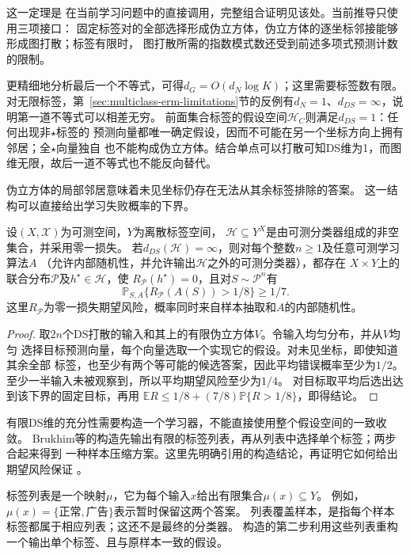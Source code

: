 这一定理是
在当前学习问题中的直接调用，完整组合证明见该处。当前推导只使用三项接口：
固定标签对的全部选择形成伪立方体，伪立方体的逐坐标邻接能够形成图打散；标签有限时，
图打散所需的指数模式数还受到前述多项式预测计数的限制。

更精细地分析最后一个不等式，可得$d_G=O(d_N\log K)$；这里需要标签数有限。
对无限标签，第~\ref{sec:multiclass-erm-limitations}节的反例有$d_N=1$、$d_{DS}=\infty$，说明第一道不等式可以相差无穷。
前面集合标签的假设空间$\mathcal H_C$则满足$d_{DS}=1$：任何出现非$\star$标签的
预测向量都唯一确定假设，因而不可能在另一个坐标方向上拥有邻居；全$\star$向量独自
也不能构成伪立方体。结合单点可以打散可知DS维为1，而图维无限，故后一道不等式也不能反向替代。

伪立方体的局部邻居意味着未见坐标仍存在无法从其余标签排除的答案。
这一结构可以直接给出学习失败概率的下界。

\begin{theorem}[无限DS维的不可学习性]
\label{thm:infinite-ds-lower-bound}
设$(X,\mathcal X)$为可测空间，$Y$为离散标签空间，
$\mathcal H\subseteq Y^X$是由可测分类器组成的非空集合，并采用零一损失。
若$d_{DS}(\mathcal H)=\infty$，则对每个整数$n\geq1$及任意可测学习算法$A$
（允许内部随机性，并允许输出$\mathcal H$之外的可测分类器），都存在
$X\times Y$上的联合分布$\mathcal P$及$h^\star\in\mathcal H$，使
$R_{\mathcal P}(h^\star)=0$，且对$S\sim\mathcal P^n$有
\[
 \mathbb P_{S,A}\{R_{\mathcal P}(A(S))>1/8\}\geq1/7.
\]
这里$R_{\mathcal P}$为零一损失期望风险，概率同时来自样本抽取和$A$的内部随机性。
\end{theorem}

\begin{proof}
取$2n$个DS打散的输入和其上的有限伪立方体$V$。令输入均匀分布，并从$V$均匀
选择目标预测向量，每个向量选取一个实现它的假设。对未见坐标，即使知道其余全部
标签，也至少有两个等可能的候选答案，因此平均错误概率至少为$1/2$。
至少一半输入未被观察到，所以平均期望风险至少为$1/4$。
对目标取平均后选出达到该下界的固定目标，再用
$\mathbb E R\leq1/8+(7/8)\mathbb P\{R>1/8\}$，即得结论。
\end{proof}

有限DS维的充分性需要构造一个学习器，不能直接使用整个假设空间的一致收敛。
Brukhim等的构造先输出有限的标签列表，再从列表中选择单个标签；两步合起来得到
一种样本压缩方案。这里先明确引用的构造结论，再证明它如何给出期望风险保证
。

标签列表是一个映射$\mu$，它为每个输入$x$给出有限集合$\mu(x)\subseteq Y$。
例如，$\mu(x)=\{\text{正常},\text{广告}\}$表示暂时保留这两个答案。
列表覆盖样本，是指每个样本标签都属于相应列表；这还不是最终的分类器。
构造的第二步利用这些列表重构一个输出单个标签、且与原样本一致的假设。

